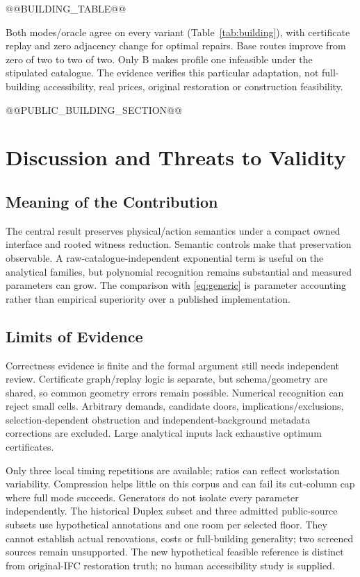 \documentclass[conference]{IEEEtran}
\begin{document}
@@BUILDING_TABLE@@

Both modes/oracle agree on every variant (Table~\ref{tab:building}), with certificate replay and zero adjacency change for optimal repairs. Base routes improve from zero of two to two of two. Only B makes profile one infeasible under the stipulated catalogue. The evidence verifies this particular adaptation, not full-building accessibility, real prices, original restoration or construction feasibility.

@@PUBLIC_BUILDING_SECTION@@
\section{Discussion and Threats to Validity}
\subsection{Meaning of the Contribution}
The central result preserves physical/action semantics under a compact owned interface and rooted witness reduction. Semantic controls make that preservation observable. A raw-catalogue-independent exponential term is useful on the analytical families, but polynomial recognition remains substantial and measured parameters can grow. The comparison with \eqref{eq:generic} is parameter accounting rather than empirical superiority over a published implementation.

\subsection{Limits of Evidence}
Correctness evidence is finite and the formal argument still needs independent review. Certificate graph/replay logic is separate, but schema/geometry are shared, so common geometry errors remain possible. Numerical recognition can reject small cells. Arbitrary demands, candidate doors, implications/exclusions, selection-dependent obstruction and independent-background metadata corrections are excluded. Large analytical inputs lack exhaustive optimum certificates.

Only three local timing repetitions are available; ratios can reflect workstation variability. Compression helps little on this corpus and can fail its cut-column cap where full mode succeeds. Generators do not isolate every parameter independently. The historical Duplex subset and three admitted public-source subsets use hypothetical annotations and one room per selected floor. They cannot establish actual renovations, costs or full-building generality; two screened sources remain unsupported. The new hypothetical feasible reference is distinct from original-IFC restoration truth; no human accessibility study is supplied.
\end{document}
